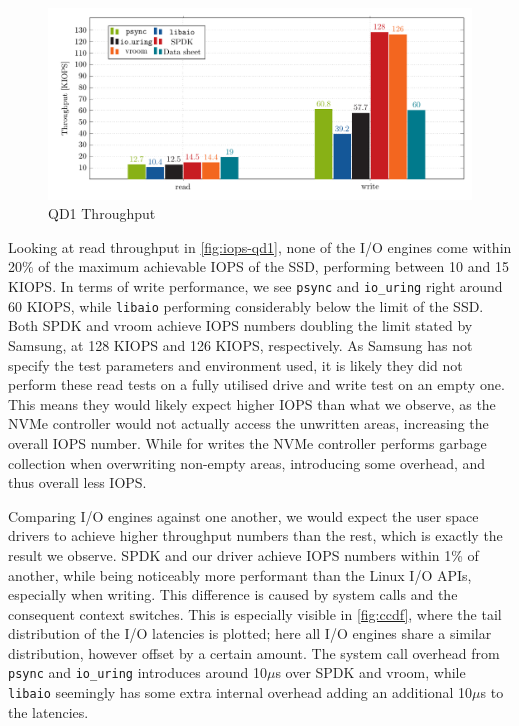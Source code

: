 \begin{figure}
  \centering
    \includegraphics[width=\textwidth]{figures/iops-qd1-ybar}
    \caption{QD1 Throughput}
    \label{fig:iops-qd1}
\end{figure}

Looking at read throughput in \autoref{fig:iops-qd1}, none of the I/O engines come within 20\% of the maximum achievable IOPS of the SSD, performing between 10 and 15 KIOPS. In terms of write performance, we see \texttt{psync} and \texttt{io\_uring} right around 60 KIOPS, while \texttt{libaio} performing considerably below the limit of the SSD. Both SPDK and vroom achieve IOPS numbers doubling the limit stated by Samsung, at 128 KIOPS and 126 KIOPS, respectively.
As Samsung has not specify the test parameters and environment used, it is likely they did not perform these read tests on a fully utilised drive and write test on an empty one. This means they would likely expect higher IOPS than what we observe, as the NVMe controller would not actually access the unwritten areas, increasing the overall IOPS number. While for writes the NVMe controller performs garbage collection when overwriting non-empty areas, introducing some overhead, and thus overall less IOPS.

Comparing I/O engines against one another, we would expect the user space drivers to achieve higher throughput numbers than the rest, which is exactly the result we observe. SPDK and our driver achieve IOPS numbers within 1\% of another, while being noticeably more performant than the Linux I/O APIs, especially when writing. This difference is caused by system calls and the consequent context switches. This is especially visible in \autoref{fig:ccdf}, where the tail distribution of the I/O latencies is plotted; here all I/O engines share a similar distribution, however offset by a certain amount. The system call overhead from \texttt{psync} and \texttt{io\_uring} introduces around 10$\mu$s over SPDK and vroom, while \texttt{libaio} seemingly has some extra internal overhead adding an additional 10$\mu$s to the latencies.

